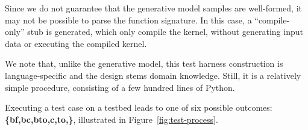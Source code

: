 Since we do not guarantee that the generative model samples are well-formed, it may not be possible to parse the function signature. In this case, a ``compile-only'' stub is generated, which only compile the kernel, without generating input data or executing the compiled kernel.

We note that, unlike the generative model, this test harness construction is language-specific and the design stems domain knowledge. Still, it is a relatively simple procedure, consisting of a few hundred lines of Python.





Executing a test case on a testbed leads to one of six possible outcomes: \textbf{\{bf,bc,bto,c,to,\cmark\}}, illustrated in Figure~\ref{fig:test-process}.

